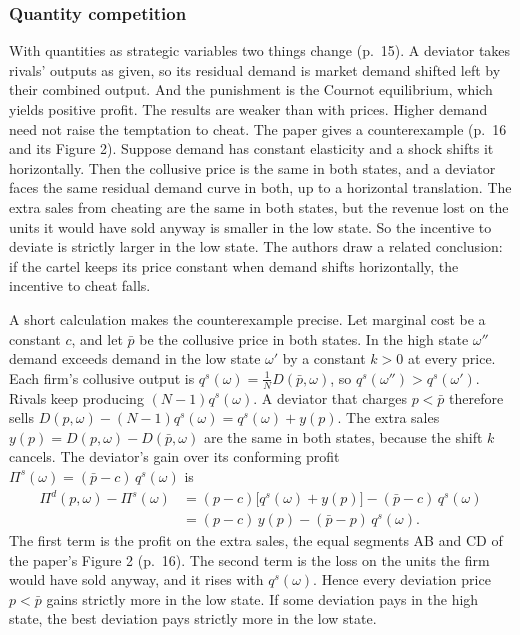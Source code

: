 \subsubsection{Quantity competition}

With quantities as strategic variables two things change (p.~15). A deviator takes rivals' outputs as given, so its
residual demand is market demand shifted left by their combined output. And the punishment is the Cournot
equilibrium, which yields positive profit. The results are weaker than with prices. Higher demand need not raise the
temptation to cheat. The paper gives a counterexample (p.~16 and its Figure 2). Suppose demand has constant elasticity
and a shock shifts it horizontally. Then the collusive price is the same in both states, and a deviator faces the same
residual demand curve in both, up to a horizontal translation. The extra sales from cheating are the same in both
states, but the revenue lost on the units it would have sold anyway is smaller in the low state. So the incentive to
deviate is strictly larger in the low state. The authors draw a related conclusion: if the cartel keeps its price
constant when demand shifts horizontally, the incentive to cheat falls.

A short calculation makes the counterexample precise. Let marginal cost be a constant $c$, and let $\bar p$ be the
collusive price in both states. In the high state $\omega''$ demand exceeds demand in the low state $\omega'$ by a
constant $k > 0$ at every price. Each firm's collusive output is $q^s(\omega) = \frac{1}{N}D(\bar p,\omega)$, so
$q^s(\omega'') > q^s(\omega')$. Rivals keep producing $(N-1)q^s(\omega)$. A deviator that charges $p < \bar p$
therefore sells $D(p,\omega) - (N-1)q^s(\omega) = q^s(\omega) + y(p)$. The extra sales
$y(p) = D(p,\omega) - D(\bar p,\omega)$ are the same in both states, because the shift $k$ cancels. The deviator's
gain over its conforming profit $\Pi^s(\omega) = (\bar p - c)\,q^s(\omega)$ is
\begin{equation*}
\begin{aligned}
\Pi^d(p,\omega) - \Pi^s(\omega)
&= (p - c)\bigl[q^s(\omega) + y(p)\bigr] - (\bar p - c)\,q^s(\omega) \\
&= (p - c)\,y(p) - (\bar p - p)\,q^s(\omega) .
\end{aligned}
\end{equation*}
The first term is the profit on the extra sales, the equal segments AB and CD of the paper's Figure 2 (p.~16). The
second term is the loss on the units the firm would have sold anyway, and it rises with $q^s(\omega)$. Hence every
deviation price $p < \bar p$ gains strictly more in the low state. If some deviation pays in the high state, the best
deviation pays strictly more in the low state.

